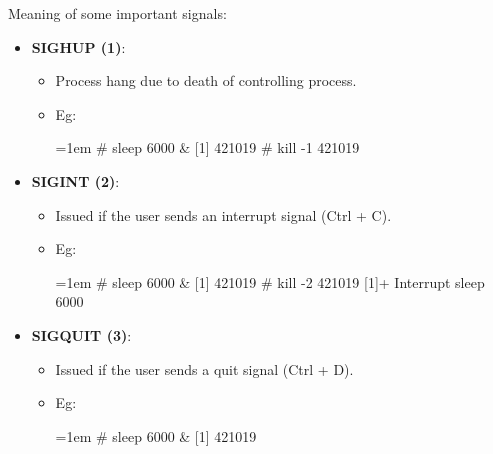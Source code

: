 \begin{flushleft}
\begin{itemize}
\begin{itemize}
			Meaning of some important signals:
			\begin{itemize}
				\item \textbf{SIGHUP (1)}: 
				\begin{itemize}
					\item Process hang due to death of controlling process.
					\item Eg:
					\begin{tcolorbox}[breakable,notitle,boxrule=-0pt,colback=black,colframe=black]
						\color{green}
						\font=1em
						\# sleep 6000 \&
						\newline
						\color{white}
						[1] 421019
						\newline
						\newline
						\color{green}						
						\# kill -1 421019
						\font=4pt
					\end{tcolorbox}
				\end{itemize}
				\item \textbf{SIGINT (2)}: 
				\begin{itemize}
					\item Issued if the user sends an interrupt signal (Ctrl + C).
					\item Eg:
					\begin{tcolorbox}[breakable,notitle,boxrule=-0pt,colback=black,colframe=black]
						\color{green}
						\fontdimen2\font=1em
						\# sleep 6000 \&
						\newline
						\color{white}
						[1] 421019
						\newline
						\newline
						\color{green}						
						\# kill -2 421019
						\newline
						\color{white}
						[1]+  Interrupt               sleep 6000
						\fontdimen2\font=4pt
					\end{tcolorbox}
				\end{itemize}
				\newpage
				\item \textbf{SIGQUIT (3)}: 
				\begin{itemize}
					\item Issued if the user sends a quit signal (Ctrl + D).
					\item Eg:
					\begin{tcolorbox}[breakable,notitle,boxrule=-0pt,colback=black,colframe=black]
						\color{green}
						\font=1em
						\# sleep 6000 \&
						\newline
						\color{white}
						[1] 421019
						\newline

\end{tcolorbox}
\end{itemize}
\end{itemize}
\end{itemize}
\end{itemize}
\end{flushleft}
